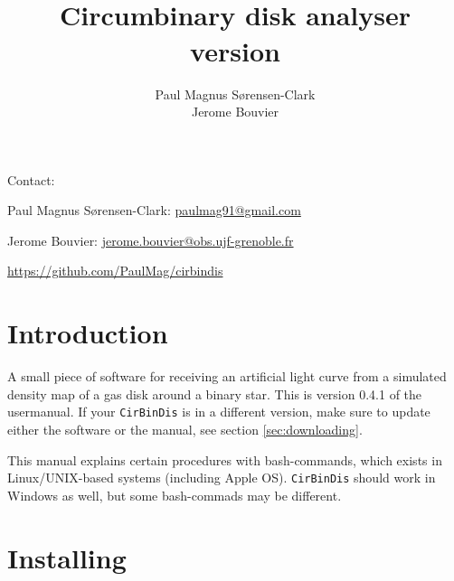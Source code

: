 \documentclass[a4paper, 12pt, english, titlepage]{article}
\title{\sname \\ Circumbinary disk analyser \\ version \sversion}
\author{Paul Magnus Sørensen-Clark \\ Jerome Bouvier}
\newcommand{\sname}{\texttt{CirBinDis}\xspace}
\newcommand{\sversion}{0.4.1\xspace}
\newenvironment{bottompar}[1]{\needspace{#1}\par\vspace*{\fill}}{\clearpage}
\begin{document}
\maketitle
\tableofcontents

\begin{bottompar}{84pt}
Contact:

Paul Magnus Sørensen-Clark:
\href{mailto:paulmag91@gmail.com}{paulmag91@gmail.com}

Jerome Bouvier:
\href{mailto:jerome.bouvier@obs.ujf-grenoble.fr}{jerome.bouvier@obs.ujf-grenoble.fr}

\url{https://github.com/PaulMag/cirbindis}
\end{bottompar}


\section{Introduction}

A small piece of software for receiving an artificial light curve from a simulated density map of a gas disk around a binary star. This is version \sversion of the usermanual. If your \sname is in a different version, make sure to update either the software or the manual, see section \vref{sec:downloading}.

This manual explains certain procedures with bash-commands, which exists in Linux/UNIX-based systems (including Apple OS). \sname should work in Windows as well, but some bash-commads may be different.


\section{Installing}
\end{document}
